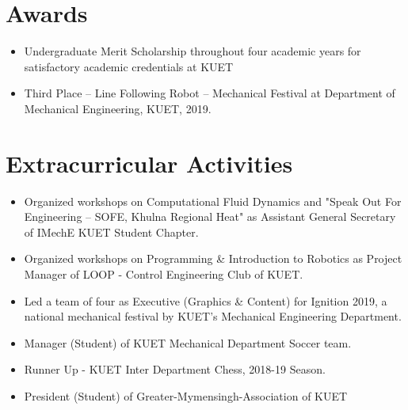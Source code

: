 \documentclass[letterpaper,11pt]{article}
\begin{document}
\section{Awards}
\begin{itemize}
\item Undergraduate Merit Scholarship throughout four academic years for satisfactory academic credentials at KUET
\vspace{-5pt}
\item Third Place – Line Following Robot – Mechanical Festival at Department of Mechanical Engineering, KUET, 2019.
\vspace{-5pt}
\end{itemize}

\section{Extracurricular Activities}
\begin{itemize}
\item Organized workshops on Computational Fluid Dynamics and "Speak Out For Engineering – SOFE, Khulna Regional Heat" as Assistant General Secretary of IMechE KUET Student Chapter.
\vspace{-5pt}
\item Organized workshops on Programming \& Introduction to Robotics as Project Manager of LOOP - Control Engineering Club of KUET. 
\vspace{-5pt}
\item Led a team of four as Executive (Graphics \& Content) for Ignition 2019, a national mechanical festival by KUET's Mechanical Engineering Department.
\vspace{-5pt}
\item Manager (Student) of KUET Mechanical Department Soccer team.
\vspace{-5pt}
\item Runner Up - KUET Inter Department Chess, 2018-19 Season.
\vspace{-5pt}
\item President (Student) of Greater-Mymensingh-Association of KUET
\vspace{-5pt}
\end{itemize}
\end{document}
